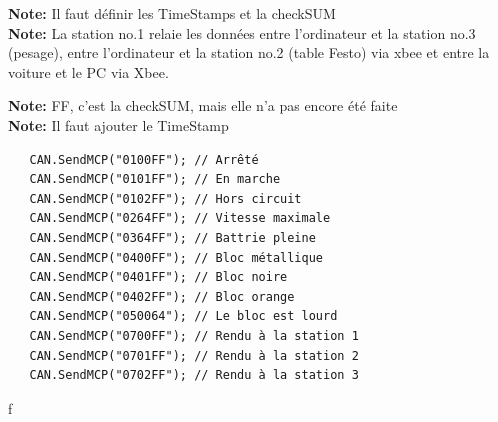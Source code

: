 \documentclass[10pt,a4paper,final]{article}
\begin{document}
\begin{spacing}{1.5}
\begin{table}[!ht]
\label{tab:testtab1}
\end{table}
\begin{flushleft}
\textbf{Note:} Il faut définir les TimeStamps et la checkSUM\\
\textbf{Note:} La station no.1 relaie les données entre l'ordinateur et la station no.3 (pesage), entre l'ordinateur et la station no.2 (table Festo) via xbee et entre la voiture et le PC via Xbee.
\end{flushleft}
\pagebreak
\textbf{Note:} FF, c'est la checkSUM, mais elle n'a pas encore été faite \\
\textbf{Note:} Il faut ajouter le TimeStamp 
\begin{verbatim}
   CAN.SendMCP("0100FF"); // Arrêté
   CAN.SendMCP("0101FF"); // En marche
   CAN.SendMCP("0102FF"); // Hors circuit
   CAN.SendMCP("0264FF"); // Vitesse maximale
   CAN.SendMCP("0364FF"); // Battrie pleine
   CAN.SendMCP("0400FF"); // Bloc métallique
   CAN.SendMCP("0401FF"); // Bloc noire
   CAN.SendMCP("0402FF"); // Bloc orange
   CAN.SendMCP("050064"); // Le bloc est lourd
   CAN.SendMCP("0700FF"); // Rendu à la station 1
   CAN.SendMCP("0701FF"); // Rendu à la station 2
   CAN.SendMCP("0702FF"); // Rendu à la station 3
\end{verbatim}

\pagebreak

\end{spacing}
f
\end{document}
